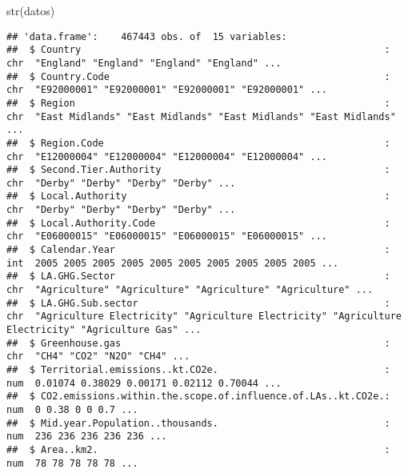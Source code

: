 \documentclass[
]{article}
\newenvironment{Shaded}{\begin{snugshade}}{\end{snugshade}}
\newcommand{\FunctionTok}[1]{\textcolor[rgb]{0.00,0.00,0.00}{#1}}
\newcommand{\NormalTok}[1]{#1}
\begin{document}
\begin{Shaded}
\begin{Highlighting}[]
\FunctionTok{str}\NormalTok{(datos)}
\end{Highlighting}
\end{Shaded}

\begin{verbatim}
## 'data.frame':    467443 obs. of  15 variables:
##  $ Country                                                     : chr  "England" "England" "England" "England" ...
##  $ Country.Code                                                : chr  "E92000001" "E92000001" "E92000001" "E92000001" ...
##  $ Region                                                      : chr  "East Midlands" "East Midlands" "East Midlands" "East Midlands" ...
##  $ Region.Code                                                 : chr  "E12000004" "E12000004" "E12000004" "E12000004" ...
##  $ Second.Tier.Authority                                       : chr  "Derby" "Derby" "Derby" "Derby" ...
##  $ Local.Authority                                             : chr  "Derby" "Derby" "Derby" "Derby" ...
##  $ Local.Authority.Code                                        : chr  "E06000015" "E06000015" "E06000015" "E06000015" ...
##  $ Calendar.Year                                               : int  2005 2005 2005 2005 2005 2005 2005 2005 2005 2005 ...
##  $ LA.GHG.Sector                                               : chr  "Agriculture" "Agriculture" "Agriculture" "Agriculture" ...
##  $ LA.GHG.Sub.sector                                           : chr  "Agriculture Electricity" "Agriculture Electricity" "Agriculture Electricity" "Agriculture Gas" ...
##  $ Greenhouse.gas                                              : chr  "CH4" "CO2" "N2O" "CH4" ...
##  $ Territorial.emissions..kt.CO2e.                             : num  0.01074 0.38029 0.00171 0.02112 0.70044 ...
##  $ CO2.emissions.within.the.scope.of.influence.of.LAs..kt.CO2e.: num  0 0.38 0 0 0.7 ...
##  $ Mid.year.Population..thousands.                             : num  236 236 236 236 236 ...
##  $ Area..km2.                                                  : num  78 78 78 78 78 ...
\end{verbatim}
\end{document}
